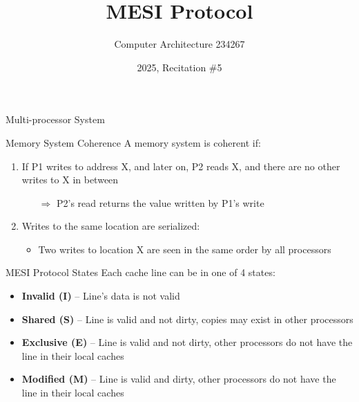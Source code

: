 \documentclass[aspectratio=169,12pt]{beamer}
\title{MESI Protocol}
\author{Computer Architecture 234267}
\date{2025, Recitation \#5}
\begin{document}
\frame{\titlepage}

\begin{frame}{Multi-processor System}
\begin{block}{Memory System Coherence}
A memory system is coherent if:
\end{block}

\begin{enumerate}
\item If P1 writes to address X, and later on, P2 reads X, and there are no other writes to X in between
    \begin{itemize}
    \item[$\Rightarrow$] P2's read returns the value written by P1's write
    \end{itemize}
\item Writes to the same location are serialized:
    \begin{itemize}
    \item Two writes to location X are seen in the same order by all processors
    \end{itemize}
\end{enumerate}

\vspace{1em}
\begin{center}
\end{center}
\end{frame}

\begin{frame}{MESI Protocol States}
Each cache line can be in one of 4 states:

\begin{itemize}
\item \textbf{Invalid (I)} -- Line's data is not valid
\vspace{0.5em}
\item \textbf{Shared (S)} -- Line is valid and not dirty, copies may exist in other processors
\vspace{0.5em}
\item \textbf{Exclusive (E)} -- Line is valid and not dirty, other processors do not have the line in their local caches
\vspace{0.5em}
\item \textbf{Modified (M)} -- Line is valid and dirty, other processors do not have the line in their local caches
\end{itemize}
\end{frame}
\end{document}
